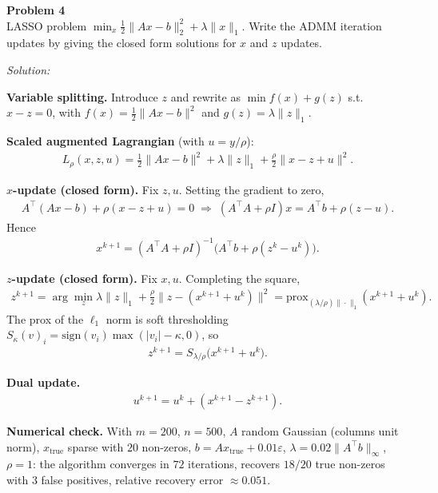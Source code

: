 \documentclass[a4paper, 11pt]{article}
\newenvironment{problem}[2][Problem]
    { \begin{mdframed}[backgroundcolor=gray!20] \textbf{#1 #2} \\}
    {  \end{mdframed}}
\newenvironment{solution}
    {\textit{Solution:}}
    {}
\begin{document}
\begin{problem}{4}
LASSO problem $\displaystyle \min_x \tfrac{1}{2}\|Ax - b\|_2^2 + \lambda \|x\|_1$. Write the ADMM iteration updates by giving the closed form solutions for $x$ and $z$ updates.
\end{problem}
\begin{solution}

\textbf{Variable splitting.} Introduce $z$ and rewrite as $\min f(x) + g(z)$ s.t. $x - z = 0$, with $f(x) = \tfrac{1}{2}\|Ax - b\|^2$ and $g(z) = \lambda\|z\|_1$.

\textbf{Scaled augmented Lagrangian} (with $u = y/\rho$):
\begin{align*}
    L_{\rho}(x, z, u) = \tfrac{1}{2}\|Ax - b\|^2 + \lambda\|z\|_1 + \tfrac{\rho}{2}\|x - z + u\|^2.
\end{align*}

\textbf{$x$-update (closed form).} Fix $z, u$. Setting the gradient to zero,
\begin{align*}
    A^{\top}(Ax - b) + \rho(x - z + u) = 0 \;\Longrightarrow\; (A^{\top}A + \rho I) x = A^{\top} b + \rho(z - u).
\end{align*}
Hence
\begin{align*}
    \boxed{\; x^{k+1} = (A^{\top}A + \rho I)^{-1} \big(A^{\top} b + \rho (z^k - u^k) \big). \;}
\end{align*}

\textbf{$z$-update (closed form).} Fix $x, u$. Completing the square,
\begin{align*}
    z^{k+1} = \arg\min_z \lambda\|z\|_1 + \tfrac{\rho}{2}\|z - (x^{k+1} + u^k)\|^2 = \mathrm{prox}_{(\lambda/\rho)\|\cdot\|_1}(x^{k+1} + u^k).
\end{align*}
The prox of the $\ell_1$ norm is soft thresholding $S_{\kappa}(v)_i = \mathrm{sign}(v_i)\max(|v_i| - \kappa, 0)$, so
\begin{align*}
    \boxed{\; z^{k+1} = S_{\lambda/\rho}\big(x^{k+1} + u^k\big). \;}
\end{align*}

\textbf{Dual update.}
\begin{align*}
    \boxed{\; u^{k+1} = u^k + (x^{k+1} - z^{k+1}). \;}
\end{align*}

\textbf{Numerical check.} With $m = 200$, $n = 500$, $A$ random Gaussian (columns unit norm), $x_{\mathrm{true}}$ sparse with $20$ non-zeros, $b = A x_{\mathrm{true}} + 0.01 \varepsilon$, $\lambda = 0.02 \|A^{\top} b\|_\infty$, $\rho = 1$: the algorithm converges in $72$ iterations, recovers $18/20$ true non-zeros with $3$ false positives, relative recovery error $\approx 0.051$.


\end{solution}
\end{document}
